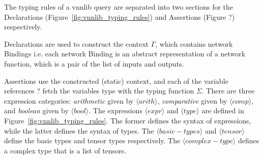 The typing rules of a vnnlib{} query are separated into two sections for the Declarations (Figure~\ref{fig:vnnlib_typing_rules}) and Assertions (Figure ?) respectively. 

Declarations are used to construct the context $\Gamma$, which contains network Bindings i.e. each network Binding is an abstract representation of a network function, which is a pair of the list of inputs and outputs.

Assertions use the constructed (static) context, and each of the variable references ? fetch the variables type with the typing function $\Sigma$.
There are three expression categories: \textit{arithmetic} given by \(\langle arith \rangle\), \textit{comparative} given by \(\langle comp \rangle\), and \textit{boolean} given by \(\langle bool \rangle\).
The expressions \(\langle expr \rangle\) and \(\langle type \rangle\) are defined in Figure~\ref{fig:vnnlib_typing_rules}. The former defines the syntax of expressions, while the latter defines the syntax of types. The \(\langle basic-types \rangle\) and \(\langle tensor \rangle\) define the basic types and tensor types respectively. The \(\langle complex-type \rangle\) defines a complex type that is a list of tensors.


